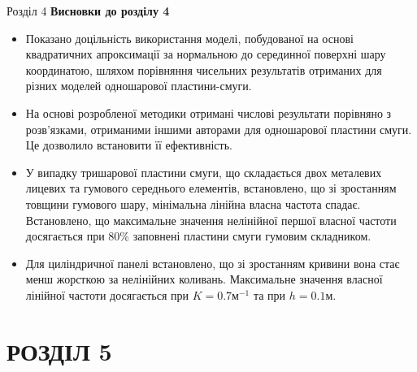 \documentclass[8pt]{beamer}
\numberwithin{figure}{section}
\numberwithin{equation}{section}
\numberwithin{table}{section}
\begin{document}
\begin{frame}{Розділ 4}
\textbf{Висновки до розділу 4}\\
\vspace{1em}
\begin{itemize}
\item Показано доцільність використання моделі, побудованої на основі квадратичних апроксимації за нормальною до серединної поверхні шару координатою, шляхом порівняння чисельних результатів отриманих для різних моделей одношарової пластини-смуги.
\item На основі розробленої методики отримані числові результати порівняно з розв'язками, отриманими іншими авторами для одношарової пластини смуги. Це дозволило встановити її ефективність.
\item У випадку тришарової пластини смуги, що складається двох металевих лицевих та гумового середнього елементів, встановлено, що зі зростанням товщини гумового шару, мінімальна лінійна власна частота спадає. Встановлено, що максимальне значення нелінійної  першої власної частоти досягається при 80\% заповнені пластини смуги гумовим складником. 
\item Для циліндричної панелі встановлено, що зі зростанням кривини вона стає менш жорсткою за нелінійних коливань. Максимальне значення власної лінійної частоти досягається при $K=0.7 м^{-1}$ та при $h=0.1 м$.
\end{itemize}

\end{frame}

\section{РОЗДІЛ 5}
\end{document}
